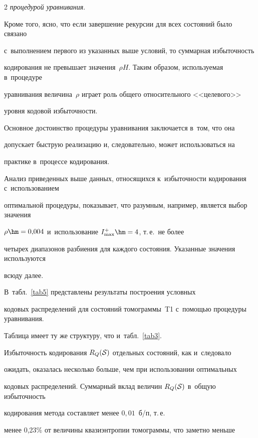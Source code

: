 \begin{multicols}{2}
\textit{процедурой уравнивания}. 

Кроме того, ясно, что если завершение рекурсии для всех состояний было связано 

с~выполнением первого из указанных выше условий, то суммарная избыточность 

кодирования не превышает значения~$\rho H$. Таким образом, используемая в~процедуре 

уравнивания величина~$\rho$ играет роль общего относительного <<целевого>> 

уровня кодовой избыточ\-ности.



Основное достоинство процедуры уравнивания заключается в~том, что она 

допускает быструю реализацию и, следовательно, может использоваться на 

практике в~процессе кодирования.



Анализ приведенных выше данных, относящихся к~избыточности кодирования с~использованием 

оптимальной процедуры, показывает, что разумным, например, является выбор значения\linebreak 

$\rho\hm=0{,}004$ и~использование $I_{\max}^+\hm=4$, т.\,е.\ не более 

четырех диапазонов разбиения для каждого состояния. Указанные значения используются 

всюду далее. 



В~табл.~\ref{tab5} представлены результаты построения условных 

кодовых распределений для состояний томограммы~T1 с~по\-мощью процедуры уравнивания. 

Таблица имеет ту же структуру, что и~табл.~\ref{tab3}.







Избыточность кодирования $R_Q({\cal S})$ отдельных состояний, как и~следовало 

ожидать, оказалась несколько больше, чем при использовании оптимальных 

кодовых распределений. Суммарный вклад величин $R_Q({\cal S})$ в~общую избыточность 

кодирования метода составляет менее $0{,}01$~б/п, т.\,е.\ 

менее 0{,}23\% от величины квазиэнтропии томограммы, что заметно меньше 


\end{multicols}
